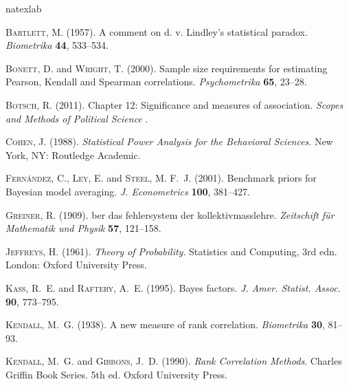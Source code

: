 \documentclass[11pt]{article}
\begin{document}


\begin{thebibliography}{18}
\expandafter\ifx\csname natexlab\endcsname\relax\def\natexlab#1{#1}\fi

\textsc{Bartlett, M.} (1957).
\newblock A comment on d. v. {L}indley's statistical paradox.
\newblock \textit{Biometrika} \textbf{44}, 533--534.

\textsc{Bonett, D.} and \textsc{Wright, T.} (2000).
\newblock Sample size requirements for estimating {P}earson, {K}endall and
  {S}pearman correlations.
\newblock \textit{Psychometrika} \textbf{65}, 23--28.

\textsc{Botsch, R.} (2011).
\newblock Chapter 12: Significance and measures of association.
\newblock \textit{Scopes and Methods of Political Science} .

\textsc{Cohen, J.} (1988).
\newblock \textit{{S}tatistical {P}ower {A}nalysis for the {B}ehavioral
  {S}ciences}.
\newblock New York, NY: Routledge Academic.

\textsc{Fern{\'a}ndez, C.}, \textsc{Ley, E.} and \textsc{Steel, M. F.~J.}
  (2001).
\newblock Benchmark priors for {B}ayesian model averaging.
\newblock \textit{J. Econometrics} \textbf{100}, 381--427.

\textsc{Greiner, R.} (1909).
ber das fehlersystem der kollektivmasslehre.
\newblock \textit{Zeitschift f{\"u}r Mathematik und Physik} \textbf{57},
  121--158.

\textsc{Jeffreys, H.} (1961).
\newblock \textit{Theory of {P}robability}.
\newblock Statistics and Computing, 3rd edn. London: Oxford University Press.

\textsc{Kass, R.~E.} and \textsc{Raftery, A.~E.} (1995).
\newblock Bayes factors.
\newblock \textit{J. Amer. Statist. Assoc.} \textbf{90}, 773--795.

\textsc{Kendall, M.~G.} (1938).
\newblock A new measure of rank correlation.
\newblock \textit{Biometrika} \textbf{30}, 81--93.

\textsc{Kendall, M.~G.} and \textsc{Gibbons, J.~D.} (1990).
\newblock \textit{Rank {C}orrelation {M}ethods}.
\newblock Charles Griffin Book Series.
\newblock 5th ed. Oxford University Press.


\end{thebibliography}
\end{document}
